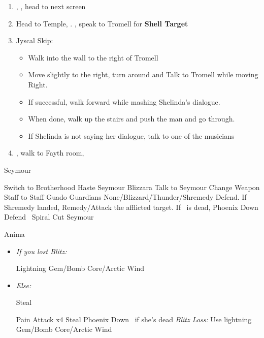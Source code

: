 \begin{enumerate}[resume]
  \item \sd, \cs[0:40], head to next screen
  \item Head to Temple, \sd. \save, speak to Tromell for \textbf{Shell Target}
  \item Jyscal Skip:
        \begin{itemize}
          \item Walk into the wall to the right of Tromell
          \item Move slightly to the right, turn around and Talk to Tromell while moving Right.
          \item If successful, walk forward while mashing Shelinda's dialogue.
          \item When done, walk up the stairs and push the man and go through.
          \item If Shelinda is not saying her dialogue, talk to one of the musicians
        \end{itemize}
  \item \sd, walk to Fayth room, \cs[2:10]
\end{enumerate}
\begin{battle}[3000]{Seymour}
  \begin{itemize}
    \tidusf Switch to Brotherhood
    \tidusf Haste \tidus
    \enemyf Seymour Blizzara
    \tidusf Talk to Seymour
    \yunaf Change Weapon Staff to Staff
    \enemyf Guado Guardians None/Blizzard/Thunder/Shremedy
    \kimahrif Defend. If Shremedy landed, Remedy/Attack the afflicted target. If \yuna\ is dead, Phoenix Down
    \switch{\yuna}{\auron}
    \auronf Defend
    \tidusf \od\ Spiral Cut Seymour
  \end{itemize}
\end{battle}
\begin{battle}[18000]{Anima}
  \begin{itemize}
    \switch{\tidus}{\wakka}
    \wakkaf Change Weapon
    \item \textit{If you lost Blitz:}
          \begin{itemize}
            \kimahrif Lightning Gem/Bomb Core/Arctic Wind
          \end{itemize}
    \item \textit{Else:}
          \begin{itemize}
            \kimahrif Steal
          \end{itemize}
          \enemyf Pain
          \tidusf Attack x4
          \rikkuf Steal
          \rikkuf Phoenix Down \yuna\ if she's dead
          \rikkuf \textit{Blitz Loss:} Use lightning Gem/Bomb Core/Arctic Wind
  \end{itemize}
\end{battle}
